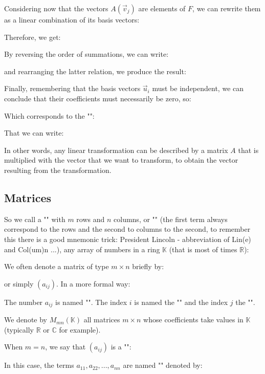 	Considering now that the vectors $A(\vec{v}_j)$ are elements of $F$, we can rewrite them as a linear combination of its basis vectors:
	
	Therefore, we get:
	
	By reversing the order of summations, we can write:
	
	and rearranging the latter relation, we produce the result:
	
	Finally, remembering that the basis vectors $\vec{u}_i$  must be independent, we can conclude that their coefficients must necessarily be zero, so:
	
	Which corresponds to the "":
	
	That we can write:
	
	In other words, any linear transformation can be described by a matrix $A$ that is multiplied with the vector that we want to transform, to obtain the vector resulting from the transformation.
	
	\pagebreak
	\subsection{Matrices}
	So we call a "" with $m$ rows and $n$ columns, or "" (the first term always correspond to the rows and the second to columns to the second, to remember this there is a good mnemonic trick: President Lincoln - abbreviation of Lin(e) and Col(um)n ...), any array of numbers in a ring $\mathbb{K}$ (that is most of times $\mathbb{R}$):
	
	We often denote a matrix of type $m\times n$ briefly by:
	
	or simply $(a_{ij})$. In a more formal way:
	
	
	The number $a_{ij}$ is named "". The index $i$ is named the "" and the index $j$ the "".
	
	We denote by $M_{mn}(\mathbb{K})$ all matrices $m\times n$ whose coefficients take values in $\mathbb{K}$ (typically $\mathbb{R}$ or $\mathbb{C}$ for example).
	
	When $m=n$, we say that $(a_{ij})$ is a "":
		
	In this case, the terms $a_{11},a_{22},...,a_{nn}$ are named "" denoted by: 
	
